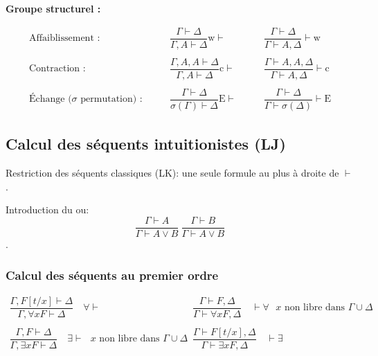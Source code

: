 \documentclass[french]{article}
\begin{document}
\textbf{Groupe structurel :}

\begin{align*}
\text{Affaiblissement :} &\qquad \dfrac{\Gamma\vdash\Delta}{\Gamma, A\vdash\Delta}\text{w}\vdash &\qquad
\dfrac{\Gamma\vdash\Delta}{\Gamma\vdash A,\Delta}\vdash\text{w}\\
\\
\text{Contraction :} &\qquad\dfrac{\Gamma, A, A\vdash\Delta}{\Gamma, A\vdash\Delta}\text{c} \vdash &\qquad
\dfrac{\Gamma\vdash A, A,\Delta}{\Gamma\vdash A,\Delta} \vdash \text{c}\\
\\
\text{Échange ($\sigma$ permutation) :}&\qquad\dfrac{\Gamma\vdash\Delta}{\sigma (\Gamma)\vdash\Delta}\text{E} \vdash &\qquad
\dfrac{\Gamma\vdash\Delta}{\Gamma\vdash\sigma (\Delta)} \vdash \text{E}
\end{align*}


\subsection{Calcul des séquents intuitionistes (LJ)}
Restriction des séquents classiques (LK): une seule formule au plus à droite de $\vdash$.

Introduction du ou:
\[\dfrac{\Gamma\vdash A}{\Gamma\vdash A\vee B}\ \frac{\Gamma\vdash B}{\Gamma\vdash A\vee B}\].



\subsubsection{Calcul des séquents au premier ordre}

\begin{align*}
\dfrac{\Gamma, F[t/x]\vdash\Delta}{\Gamma, \forall x F\vdash\Delta} \quad \forall\vdash &\qquad  \dfrac{\Gamma\vdash F,\Delta}{\Gamma\vdash\forall x F,\Delta} \quad \vdash\forall \text{ $x$ non libre dans $\Gamma\cup\Delta$}
\\
\\
\dfrac{\Gamma, F\vdash\Delta}{\Gamma, \exists x F\vdash\Delta} \quad \exists\vdash \text{ $x$ non libre dans  $\Gamma\cup\Delta$}  &\qquad
\dfrac{\Gamma\vdash F[t/x],\Delta}{\Gamma\vdash\exists x F,\Delta} \quad \vdash\exists 
\end{align*}
\end{document}
